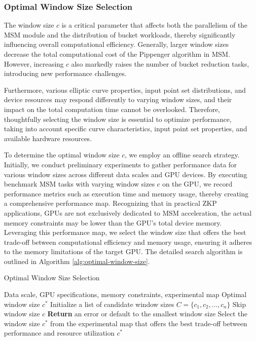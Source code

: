 \documentclass[journal=tches,final]{iacrtrans}
\begin{document}
\subsubsection{\textbf{Optimal Window Size Selection}}

The window size \( c \) is a critical parameter that affects both the parallelism of the MSM module and the distribution of bucket workloads, thereby significantly influencing overall computational efficiency. Generally, larger window sizes decrease the total computational cost of the Pippenger algorithm in MSM. However, increasing \( c \) also markedly raises the number of bucket reduction tasks, introducing new performance challenges.

Furthermore, various elliptic curve properties, input point set distributions, and device resources may respond differently to varying window sizes, and their impact on the total computation time cannot be overlooked. Therefore, thoughtfully selecting the window size is essential to optimize performance, taking into account specific curve characteristics, input point set properties, and available hardware resources.

To determine the optimal window size \( c \), we employ an offline search strategy. Initially, we conduct preliminary experiments to gather performance data for various window sizes across different data scales and GPU devices. By executing benchmark MSM tasks with varying window sizes \( c \) on the GPU, we record performance metrics such as execution time and memory usage, thereby creating a comprehensive performance map. Recognizing that in practical ZKP applications, GPUs are not exclusively dedicated to MSM acceleration, the actual memory constraints may be lower than the GPU's total device memory. Leveraging this performance map, we select the window size that offers the best trade-off between computational efficiency and memory usage, ensuring it adheres to the memory limitations of the target GPU. The detailed search algorithm is outlined in Algorithm \ref{alg:optimal-window-size}.
\begin{algorithm}
    \caption{Optimal Window Size Selection}
    \label{alg:optimal-window-size}
    \begin{algorithmic}[1]
    \REQUIRE Data scale, GPU specifications, memory constraints, experimental map
    \ENSURE Optimal window size \( c^* \)
    \STATE Initialize a list of candidate window sizes \( C = \{c_1, c_2, \ldots, c_n\} \)
            \STATE Skip window size \( c \)
        \ENDIF
    \ENDFOR
        \STATE \textbf{Return} an error or default to the smallest window size
    \ELSE
        \STATE Select the window size \( c^* \) from the experimental map that offers the best trade-off between performance and resource utilization
    \ENDIF
    \RETURN \( c^* \)
    \end{algorithmic}
\end{algorithm}
\end{document}

